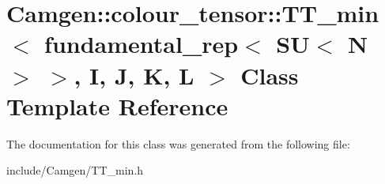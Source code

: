 \hypertarget{a00537}{\section{Camgen\-:\-:colour\-\_\-tensor\-:\-:T\-T\-\_\-min$<$ fundamental\-\_\-rep$<$ S\-U$<$ N $>$ $>$, I, J, K, L $>$ Class Template Reference}
\label{a00537}
}


The documentation for this class was generated from the following file\-:\begin{DoxyCompactItemize}
\item 
include/\-Camgen/T\-T\-\_\-min.\-h\end{DoxyCompactItemize}
